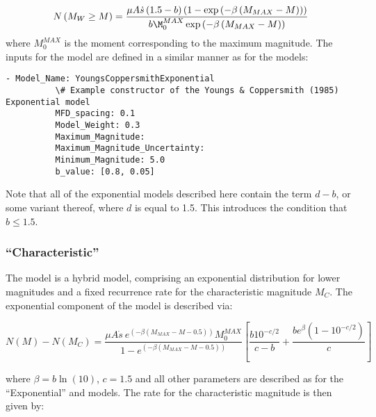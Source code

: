 \begin{equation}
N \left( {M_W \geq M} \right) = \frac{\mu A \dot{s} \left( {1.5 - b} \right) \left( {1 - \exp \left( {-\beta \left( {M_{MAX} - M} \right)} \right)} \right)}{b \M_{0}^{MAX} \exp \left( {-\beta \left( {M_{MAX} - M} \right)} \right)}
\end{equation}
where $M_0^{MAX}$ is the moment corresponding to the maximum magnitude. The inputs for the model are defined in a similar manner as for the \cite{AndersonLuco1983} models:

\begin{Verbatim}[frame=single, commandchars=\\\{\}, fontsize=\scriptsize]
        - Model_Name: YoungsCoppersmithExponential
          \# Example constructor of the Youngs & Coppersmith (1985) Exponential model
          MFD_spacing: 0.1
          Model_Weight: 0.3
          Maximum_Magnitude:
          Maximum_Magnitude_Uncertainty:
          Minimum_Magnitude: 5.0
          b_value: [0.8, 0.05]
\end{Verbatim}

Note that all of the exponential models described here contain the term $d - b$, or some variant thereof, where $d$ is equal to 1.5. This introduces the condition that $b \leq 1.5$. 

\subsubsection{\cite{YoungsCoppersmith1985} ``Characteristic''}

The \cite{YoungsCoppersmith1985} model is a hybrid model, comprising an exponential distribution for lower magnitudes and a fixed recurrence rate for the characteristic magnitude $M_C$. The exponential component of the model is described via:

\begin{equation}
N \left( M \right) - N \left( {M_C} \right) = \frac{\mu A \dot{s}\ e^{\left( {-\beta \left( {M_{MAX} - M - 0.5} \right)}\right)} M_{0}^{MAX}}{1 - e^{\left( {-\beta \left( {M_{MAX} - M - 0.5} \right)} \right)}} 
 \left[ {\frac{b10^{-c/2}}{c - b} + \frac{b e^{\beta}\left({1 - 10^{-c/2}}\right)}{c}} \right]\end{equation}

where $\beta = b \ln \left( {10} \right)$, $c = 1.5$ and all other parameters are described as for the \cite{YoungsCoppersmith1985} ``Exponential'' and \cite{AndersonLuco1983} models. The rate for the characteristic magnitude is then given by:

